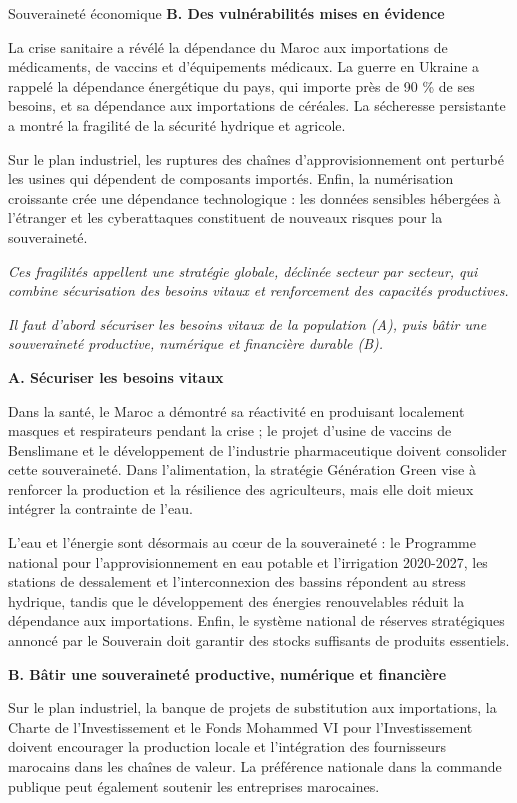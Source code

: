 \begin{copiemodele}{Souveraineté économique}
\textbf{B. Des vulnérabilités mises en évidence}

La crise sanitaire a révélé la dépendance du Maroc aux importations de médicaments, de vaccins et d'équipements médicaux. La guerre en Ukraine a rappelé la dépendance énergétique du pays, qui importe près de 90 \% de ses besoins, et sa dépendance aux importations de céréales. La sécheresse persistante a montré la fragilité de la sécurité hydrique et agricole.

Sur le plan industriel, les ruptures des chaînes d'approvisionnement ont perturbé les usines qui dépendent de composants importés. Enfin, la numérisation croissante crée une dépendance technologique : les données sensibles hébergées à l'étranger et les cyberattaques constituent de nouveaux risques pour la souveraineté.

\textit{Ces fragilités appellent une stratégie globale, déclinée secteur par secteur, qui combine sécurisation des besoins vitaux et renforcement des capacités productives.}

\textit{Il faut d'abord sécuriser les besoins vitaux de la population (A), puis bâtir une souveraineté productive, numérique et financière durable (B).}

\textbf{A. Sécuriser les besoins vitaux}

Dans la santé, le Maroc a démontré sa réactivité en produisant localement masques et respirateurs pendant la crise ; le projet d'usine de vaccins de Benslimane et le développement de l'industrie pharmaceutique doivent consolider cette souveraineté. Dans l'alimentation, la stratégie Génération Green vise à renforcer la production et la résilience des agriculteurs, mais elle doit mieux intégrer la contrainte de l'eau.

L'eau et l'énergie sont désormais au cœur de la souveraineté : le Programme national pour l'approvisionnement en eau potable et l'irrigation 2020-2027, les stations de dessalement et l'interconnexion des bassins répondent au stress hydrique, tandis que le développement des énergies renouvelables réduit la dépendance aux importations. Enfin, le système national de réserves stratégiques annoncé par le Souverain doit garantir des stocks suffisants de produits essentiels.

\textbf{B. Bâtir une souveraineté productive, numérique et financière}

Sur le plan industriel, la banque de projets de substitution aux importations, la Charte de l'Investissement et le Fonds Mohammed VI pour l'Investissement doivent encourager la production locale et l'intégration des fournisseurs marocains dans les chaînes de valeur. La préférence nationale dans la commande publique peut également soutenir les entreprises marocaines.


\end{copiemodele}
